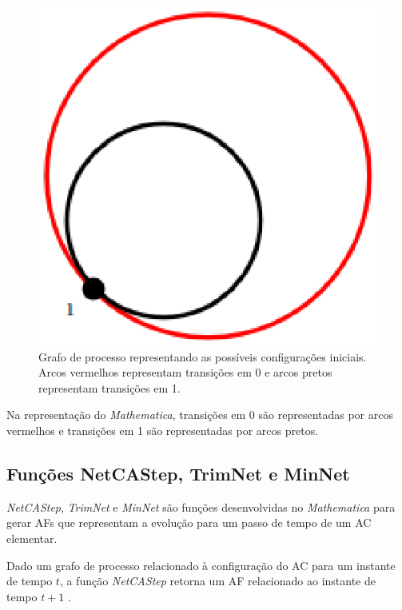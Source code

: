 \documentclass[12pt,a4paper]{article}
\begin{document}
\begin{figure}[htp]
\begin{center}
\includegraphics[scale=0.3]{img/InitialConfig.eps}
\caption{Grafo de processo representando as possíveis configurações
iniciais. Arcos vermelhos representam transições em 0 e arcos
pretos representam transições em 1.}
\label{fig:initconfigmathematica}
\end{center}
\end{figure}

Na representação do \textit{Mathematica}, transições em 0 são
representadas por arcos vermelhos e transições em 1 são
representadas por arcos pretos.

\subsection{Funções NetCAStep, TrimNet e MinNet}

\emph{NetCAStep}, \emph{TrimNet} e \emph{MinNet}  são
funções desenvolvidas no \textit{Mathematica} para gerar AFs
que representam a evolução para um passo de tempo de um AC
elementar.

Dado um grafo de processo relacionado à configuração do AC para
um instante de tempo $t$, a função \emph{NetCAStep} 
retorna um AF relacionado ao instante de tempo $t+1$
.
\end{document}
